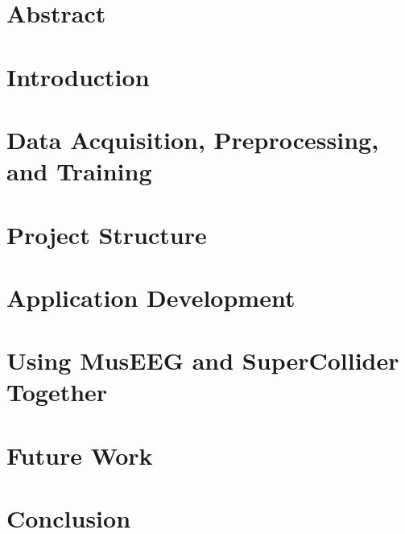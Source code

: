 \documentclass[12pt]{report}
\begin{document}
\chapter{Abstract}


\chapter{Introduction}


\chapter{Data Acquisition, Preprocessing, and Training}
\label{chap:dataAcquisition}


\chapter{Project Structure}


\chapter{Application Development}


\chapter{Using MusEEG and SuperCollider Together}


\chapter{Future Work}


\chapter{Conclusion}




	
\end{document}
